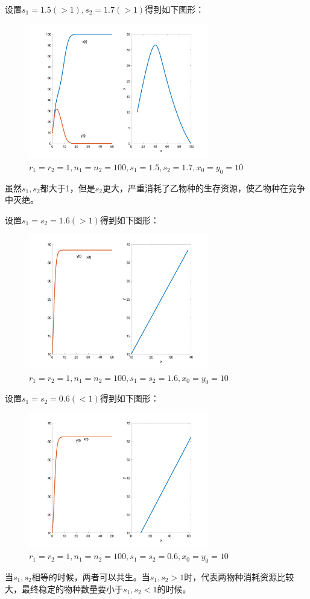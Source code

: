 \documentclass{article}
\begin{document}
设置$s_1=1.5(>1),s_2=1.7(>1)$得到如下图形：
\begin{figure}[H]
    \centering
    \includegraphics[width=0.7\textwidth]{pic97.png}
    \caption{$r_1=r_2=1, n_1=n_2=100, s_1=1.5, s_2=1.7, x_0=y_0=10$}
\end{figure}
虽然$s_1,s_2$都大于1，但是$s_2$更大，严重消耗了乙物种的生存资源，使乙物种在竞争中灭绝。

设置$s_1=s_2=1.6(>1)$得到如下图形：
\begin{figure}[H]
    \centering
    \includegraphics[width=0.7\textwidth]{pic98.png}
    \caption{$r_1=r_2=1, n_1=n_2=100, s_1=s_2=1.6, x_0=y_0=10$}
\end{figure}

设置$s_1=s_2=0.6(<1)$得到如下图形：
\begin{figure}[H]
    \centering
    \includegraphics[width=0.7\textwidth]{pic99.png}
    \caption{$r_1=r_2=1, n_1=n_2=100, s_1=s_2=0.6, x_0=y_0=10$}
\end{figure}
当$s_1,s_2$相等的时候，两者可以共生。当$s_1,s_2>1$时，代表两物种消耗资源比较大，最终稳定的物种数量要小于$s_1,s_2<1$的时候。
\end{document}
